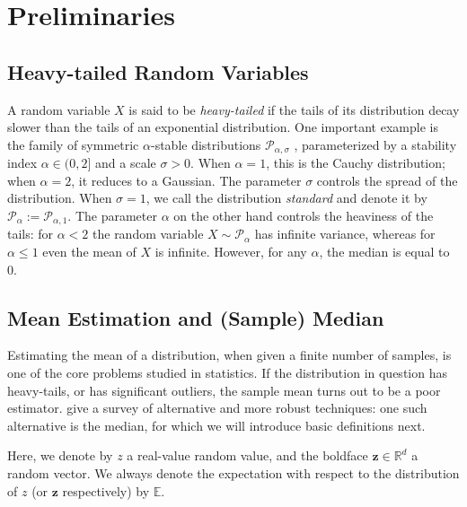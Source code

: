\documentclass[10pt]{article} %
\renewcommand{\vec}[1]{\bm{#1}}
\newcommand{\R}{\mathbb{R}}
\begin{document}
\section{Preliminaries}
%
\subsection{Heavy-tailed Random Variables}

A random variable $X$ is said to be \emph{heavy-tailed} if
the tails of its distribution decay slower
than the tails of an exponential distribution.
One important example is the family of symmetric $\alpha$-stable distributions $\mathcal{P}_{\alpha, \sigma}$ \citep[Def.\ 1.4]{Nolan2020}, parameterized by a stability index $\alpha \in (0, 2]$ and a scale $\sigma > 0$. When $\alpha = 1$, this is the Cauchy distribution; when $\alpha = 2$, it reduces to a Gaussian.
%
The parameter $\sigma$ controls the spread of the distribution. When $\sigma = 1$, we call the distribution \emph{standard} and denote it by $\mathcal{P}_{\alpha} := \mathcal{P}_{\alpha,1}$.
The parameter $\alpha$ on the other hand controls the heaviness of the tails: for $\alpha<2$ the random variable $X\sim \mathcal{P}_{\alpha}$ has infinite variance, whereas for $\alpha\leq 1$ even the mean of $X$ is infinite. However, for any $\alpha$, the median is equal to $0$. 


\subsection{Mean Estimation and (Sample) Median}

Estimating the mean of a distribution, when given a finite number of samples, is one of the core problems studied in statistics. 
If the distribution in question has heavy-tails, or has significant outliers, the sample mean turns out to be a poor estimator. \citet{Lugosi2019} give a survey of alternative and more robust techniques: one such alternative is the median, for which we will introduce basic definitions next. 

Here, we denote by $z$ a real-value random value, and the boldface  $\vec{z}\in \R^d$ a random vector. We always denote the expectation with respect to the distribution of $z$ (or $\vec{z}$ respectively) by $\mathbb{E}$. 
\end{document}
